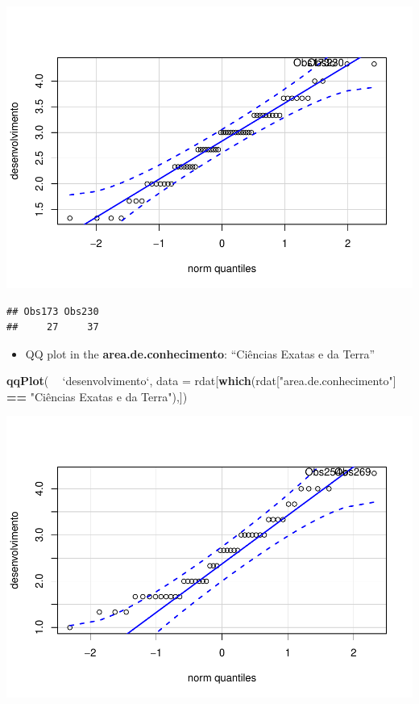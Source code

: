 \documentclass[]{article}
\newenvironment{Shaded}{\begin{snugshade}}{\end{snugshade}}
\newcommand{\DataTypeTok}[1]{\textcolor[rgb]{0.13,0.29,0.53}{#1}}
\newcommand{\KeywordTok}[1]{\textcolor[rgb]{0.13,0.29,0.53}{\textbf{#1}}}
\newcommand{\NormalTok}[1]{#1}
\newcommand{\OperatorTok}[1]{\textcolor[rgb]{0.81,0.36,0.00}{\textbf{#1}}}
\newcommand{\StringTok}[1]{\textcolor[rgb]{0.31,0.60,0.02}{#1}}
\providecommand{\tightlist}{%
  \setlength{\itemsep}{0pt}\setlength{\parskip}{0pt}}
\begin{document}
\includegraphics{factorialAnova_files/figure-latex/unnamed-chunk-11-1.pdf}

\begin{verbatim}
## Obs173 Obs230 
##     27     37
\end{verbatim}

\begin{itemize}
\tightlist
\item
  QQ plot in the \textbf{area.de.conhecimento}: ``Ciências Exatas e da
  Terra''
\end{itemize}

\begin{Shaded}
\begin{Highlighting}[]
\KeywordTok{qqPlot}\NormalTok{( }\OperatorTok{~}\StringTok{ `}\DataTypeTok{desenvolvimento}\StringTok{`}\NormalTok{, }\DataTypeTok{data =}\NormalTok{ rdat[}\KeywordTok{which}\NormalTok{(rdat[}\StringTok{"area.de.conhecimento"}\NormalTok{] }\OperatorTok{==}\StringTok{ "Ciências Exatas e da Terra"}\NormalTok{),])}
\end{Highlighting}
\end{Shaded}

\includegraphics{factorialAnova_files/figure-latex/unnamed-chunk-12-1.pdf}
\end{document}
